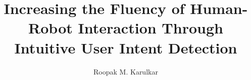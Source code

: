 



	
	\frontmatter             %
	
	\title{ Increasing the Fluency of Human-Robot Interaction Through Intuitive User Intent Detection }  %
	
	\author{ Roopak M. Karulkar }      %
	
	\maketitle               %
	
	 \makecopyright        %
	
	
	 
	
	
	\tableofcontents
	\listoffigures
	\listoftables
	
